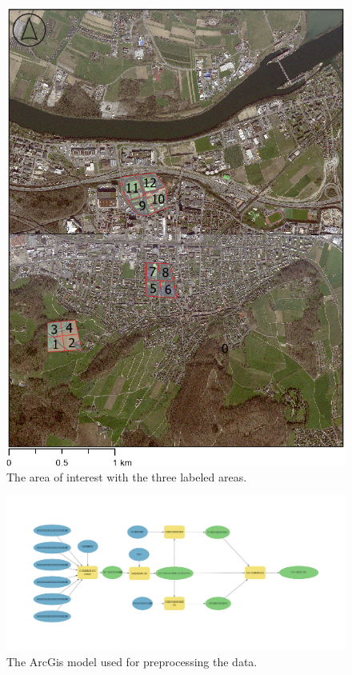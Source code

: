 \begin{figure}[H]
    \centering
    \captionsetup{width=0.8\linewidth}
    \includegraphics[scale=0.6]{figures/AOI_Labeled.png}
    \caption{The area of interest with the three labeled areas.}
    \label{fig:aoi_labeled}
\end{figure}

\begin{figure}
    \centering
    \captionsetup{width=0.8\linewidth}
    \includegraphics[width=\linewidth]{figures/Model.pdf}
    \caption{The ArcGis model used for preprocessing the data.}
    \label{fig:processing_model}
\end{figure}

